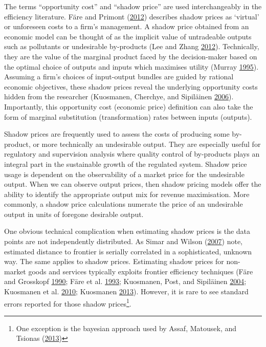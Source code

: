 \documentclass[
  12pt,
]{article}
\begin{document}
The terms ``opportunity cost'' and ``shadow price'' are used interchangeably in the efficiency literature. Färe and Primont (\protect\hyperlink{ref-Fare2012}{2012}) describes shadow prices as `virtual' or unforeseen costs to a firm's management. A shadow price obtained from an economic model can be thought of as the implicit value of untradeable outputs such as pollutants or undesirable by-products (Lee and Zhang \protect\hyperlink{ref-Lee2012}{2012}). Technically, they are the value of the marginal product faced by the decision-maker based on the optimal choice of outputs and inputs which maximises utility (Murray \protect\hyperlink{ref-Murray1995}{1995}). Assuming a firm's choices of input-output bundles are guided by rational economic objectives, these shadow prices reveal the underlying opportunity costs hidden from the researcher (Kuosmanen, Cherchye, and Sipiläinen \protect\hyperlink{ref-Kuosmanen2006}{2006}). Importantly, this opportunity cost (economic price) definition can also take the form of marginal substitution (transformation) rates between inputs (outputs).

Shadow prices are frequently used to assess the costs of producing some by-product, or more technically an undesirable output. They are especially useful for regulatory and supervision analysis where quality control of by-products plays an integral part in the sustainable growth of the regulated system. Shadow price usage is dependent on the observability of a market price for the undesirable output. When we can observe output prices, then shadow pricing models offer the ability to identify the appropriate output mix for revenue maximisation. More commonly, a shadow price calculations numerate the price of an undesirable output in units of foregone desirable output.

One obvious technical complication when estimating shadow prices is the data points are not independently distributed. As Simar and Wilson (\protect\hyperlink{ref-Simar2007}{2007}) note, estimated distance to frontier is serially correlated in a sophisticated, unknown way. The same applies to shadow prices. Estimating shadow prices for non-market goods and services typically exploits frontier efficiency techniques (Färe and Grosskopf \protect\hyperlink{ref-Fare1990}{1990}; Färe et al. \protect\hyperlink{ref-Fare1993}{1993}; Kuosmanen, Post, and Sipiläinen \protect\hyperlink{ref-Kuosmanen2004}{2004}; Kuosmanen et al. \protect\hyperlink{ref-Kuosmanen2010}{2010}; Kuosmanen \protect\hyperlink{ref-Kuosmanen2013}{2013}). However, it is rare to see standard errors reported for those shadow prices\footnote{One exception is the bayesian approach used by Assaf, Matousek, and Tsionas (\protect\hyperlink{ref-Assaf2013}{2013})}.
\end{document}
